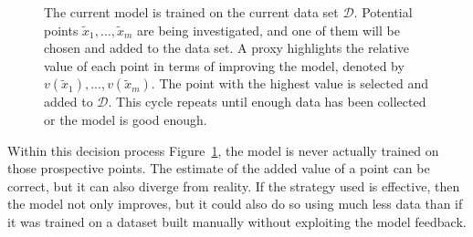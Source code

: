 \documentclass[
  letterpaper,
  numbers=noenddot,
  DIV=11,
  oneside]{scrreprt}
\theoremstyle{remark}
\begin{document}
\begin{figure}


\caption{\label{fig-schema}The current model is trained on the current
data set \(\mathcal{D}\). Potential points
\(\tilde{x}_1, \ldots, \tilde{x}_m\) are being investigated, and one of
them will be chosen and added to the data set. A proxy highlights the
relative value of each point in terms of improving the model, denoted by
\(v(\tilde{x}_1), \ldots, v(\tilde{x}_m)\). The point with the highest
value is selected and added to \(\mathcal{D}\). This cycle repeats until
enough data has been collected or the model is good enough.}

\end{figure}%

Within this decision process Figure~\ref{fig-schema}, the model is never
actually trained on those prospective points. The estimate of the added
value of a point can be correct, but it can also diverge from reality.
If the strategy used is effective, then the model not only improves, but
it could also do so using much less data than if it was trained on a
dataset built manually without exploiting the model feedback.
\end{document}
